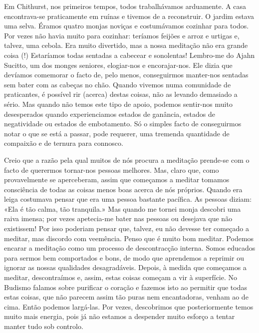 Em Chithurst, nos primeiros tempos, todos trabalhávamos arduamente. A
casa encontrava-se praticamente em ruínas e tivemos de a reconstruir. O
jardim estava uma selva. Éramos quatro monjas noviças e costumávamos
cozinhar para todos. Por vezes não havia muito para cozinhar: teríamos
feijões e arroz e urtigas e, talvez, uma cebola. Era muito divertido,
mas a nossa meditação não era grande coisa (!) Estaríamos todas
sentadas a cabecear e sonolentas! Lembro-me do Ajahn Sucitto, um dos
monges seniores, elogiar-nos e encorajar-nos. Ele dizia que devíamos
comemorar o facto de, pelo menos, conseguirmos manter-nos sentadas sem
bater com as cabeças no chão. Quando vivemos numa comunidade de
praticantes, é possível rir (acerca) destas coisas, não as levando
demasiado a sério. Mas quando não temos este tipo de apoio, podemos
sentir-nos muito desesperados quando experienciamos estados de ganância,
estados de negatividade ou estados de embotamento. Só o simples facto de
conseguirmos notar o que se está a passar, pode requerer, uma tremenda
quantidade de compaixão e de ternura para connosco.

Creio que a razão pela qual muitos de nós procura a meditação prende-se
com o facto de querermos tornar-nos pessoas melhores. Mas, claro que,
como provavelmente se aperceberam, assim que começamos a meditar tomamos
consciência de todas as coisas menos boas acerca de nós próprios. Quando
era leiga costumava pensar que era uma pessoa bastante pacífica. As
pessoas diziam: «Ela é tão calma, tão tranquila.» Mas quando me tornei
monja descobri uma raiva imensa; por vezes apetecia-me bater nas pessoas
ou desejava que não existissem! Por isso poderiam pensar que, talvez, eu
não devesse ter começado a meditar, mas discordo com veemência. Penso
que é muito bom meditar. \mbox{Podemos} encarar a meditação como um processo de
descontracção interna. Somos educados para sermos bem comportados e
bons, de modo que aprendemos a reprimir ou ignorar as nossas qualidades
desagradáveis. Depois, à medida que começamos a meditar, descontraímos
e, assim, estas coisas começam a vir à superfície. No Budismo falamos
sobre purificar o coração e fazemos isto ao permitir que todas estas
coisas, que não parecem assim tão puras nem encantadoras, venham ao de
cima. Então podemos largá-las. Por vezes, descobrimos que posteriormente
temos muito mais energia, pois já não estamos a despender muito esforço
a tentar manter tudo sob controlo.

